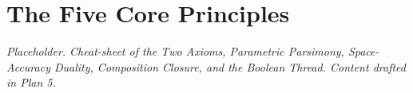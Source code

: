 \chapter{The Five Core Principles}
\label{app:five-principles}

\textit{Placeholder. Cheat-sheet of the Two Axioms, Parametric Parsimony,
Space-Accuracy Duality, Composition Closure, and the Boolean Thread.
Content drafted in Plan 5.}
